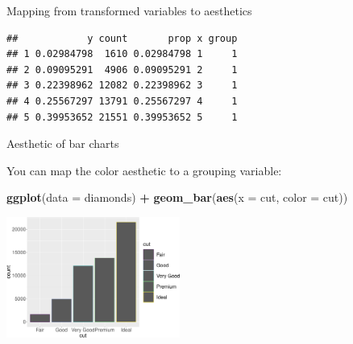 \documentclass[ignorenonframetext,]{beamer}
\newenvironment{Shaded}{\begin{snugshade}}{\end{snugshade}}
\newcommand{\DataTypeTok}[1]{\textcolor[rgb]{0.13,0.29,0.53}{#1}}
\newcommand{\DecValTok}[1]{\textcolor[rgb]{0.00,0.00,0.81}{#1}}
\newcommand{\KeywordTok}[1]{\textcolor[rgb]{0.13,0.29,0.53}{\textbf{#1}}}
\newcommand{\NormalTok}[1]{#1}
\newcommand{\OperatorTok}[1]{\textcolor[rgb]{0.81,0.36,0.00}{\textbf{#1}}}
\newcommand{\StringTok}[1]{\textcolor[rgb]{0.31,0.60,0.02}{#1}}
\begin{document}
\begin{frame}[fragile]{Mapping from transformed variables to aesthetics}
\protect\hypertarget{mapping-from-transformed-variables-to-aesthetics-5}{}

\begin{Shaded}
\end{Shaded}

\begin{verbatim}
##            y count       prop x group
## 1 0.02984798  1610 0.02984798 1     1
## 2 0.09095291  4906 0.09095291 2     1
## 3 0.22398962 12082 0.22398962 3     1
## 4 0.25567297 13791 0.25567297 4     1
## 5 0.39953652 21551 0.39953652 5     1
\end{verbatim}

\end{frame}

\begin{frame}[fragile]{Aesthetic of bar charts}
\protect\hypertarget{aesthetic-of-bar-charts}{}

You can map the color aesthetic to a grouping variable:

\begin{Shaded}
\begin{Highlighting}[]
\KeywordTok{ggplot}\NormalTok{(}\DataTypeTok{data =}\NormalTok{ diamonds) }\OperatorTok{+}\StringTok{ }
\StringTok{  }\KeywordTok{geom_bar}\NormalTok{(}\KeywordTok{aes}\NormalTok{(}\DataTypeTok{x =}\NormalTok{ cut, }\DataTypeTok{color =}\NormalTok{ cut))}
\end{Highlighting}
\end{Shaded}

\begin{center}\includegraphics[height=150px]{data-visualization_files/figure-beamer/unnamed-chunk-123-1} \end{center}

\end{frame}
\end{document}
